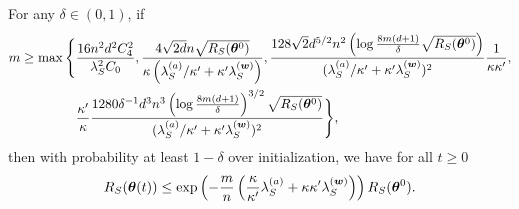 \documentclass{article}
\begin{document}
\begin{thm}\label{thm:main}
    For any $\delta\in(0,1)$, if
    \begin{align}
        m\geq\max\Bigg\{ & \frac{16n^2d^2C_4^2}{\lambda_S^2C_0}, \frac{4\sqrt{2d}n\sqrt{R_S(\bm{\theta}^0)}}{\kappa\left(\lambda_S^{(a)}/\kappa'+\kappa'\lambda_S^{(\bm{w})}\right)}, \frac{128\sqrt{2}d^{5/2}n^2\left(\log\frac{8m(d+1)}{\delta}\sqrt{R_S(\bm{\theta}^0)}\right)}{(\lambda_S^{(a)}/\kappa'+\kappa'\lambda_S^{(\bm{w})})^2}\frac{1}{\kappa\kappa'}, \\
                         & \frac{\kappa'}{\kappa}\frac{1280\delta^{-1}d^3n^3\left(\log\frac{8m(d+1)}{\delta}\right)^{3/2}\sqrt{R_S(\bm{\theta}^0)}}{(\lambda_S^{(a)}/\kappa'+\kappa'\lambda_S^{(\bm{w})})^2}\Bigg\},
    \end{align}
    then with probability at least $1-\delta$ over initialization, we have for all $t\geq 0$
    \begin{equation}
        R_S(\bm{\theta}(t))\leq\exp\left(-\frac{m}{n}\left(\frac{\kappa}{\kappa'}\lambda_S^{(a)}+\kappa\kappa'\lambda_S^{(\bm{w})}\right)\right)R_S(\bm{\theta}^0).
    \end{equation}
\end{thm}
\end{document}
